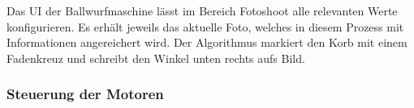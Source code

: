 Das UI der Ballwurfmaschine lässt im Bereich Fotoshoot alle relevanten Werte konfigurieren. Es erhält jeweils das aktuelle Foto, welches in diesem Prozess mit Informationen angereichert wird. Der Algorithmus markiert den Korb mit einem Fadenkreuz und schreibt den Winkel unten rechts aufs Bild.

\subsubsection{Steuerung der Motoren}

